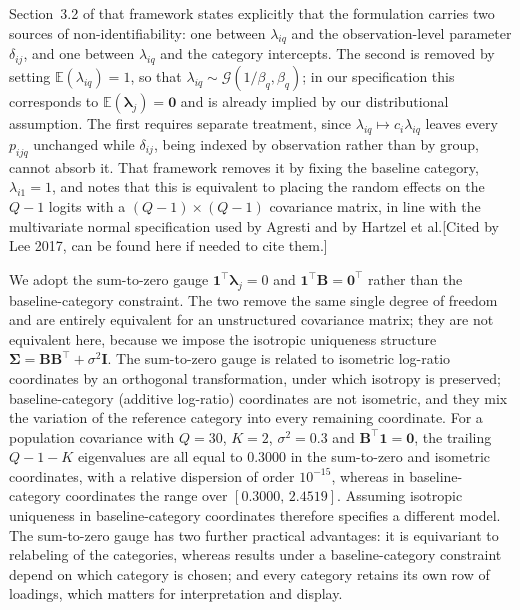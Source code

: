 Section~3.2 of that framework states explicitly that the formulation carries two sources of non-identifiability: one between $\lambda_{iq}$ and the observation-level parameter $\delta_{ij}$, and one between $\lambda_{iq}$ and the category intercepts. The second is removed by setting $\mathbb{E}(\lambda_{iq})=1$, so that $\lambda_{iq}\sim\mathcal{G}(1/\beta_q,\beta_q)$; in our specification this corresponds to $\mathbb{E}(\bm{\lambda}_j)=\mathbf{0}$ and is already implied by our distributional assumption. The first requires separate treatment, since $\lambda_{iq}\mapsto c_i\lambda_{iq}$ leaves every $p_{ijq}$ unchanged while $\delta_{ij}$, being indexed by observation rather than by group, cannot absorb it. That framework removes it by fixing the baseline category, $\lambda_{i1}=1$, and notes that this is equivalent to placing the random effects on the $Q-1$ logits with a $(Q-1)\times(Q-1)$ covariance matrix, in line with the multivariate normal specification used by Agresti and by Hartzel et al.[Cited by Lee 2017, can be found here if needed to cite them.]

We adopt the sum-to-zero gauge $\mathbf{1}^{\top}\bm{\lambda}_j=0$ and $\mathbf{1}^{\top}\mathbf{B}=\mathbf{0}^{\top}$ rather than the baseline-category constraint. The two remove the same single degree of freedom and are entirely equivalent for an unstructured covariance matrix; they are not equivalent here, because we impose the isotropic uniqueness structure $\bm{\Sigma}=\mathbf{B}\mathbf{B}^{\top}+\sigma^{2}\mathbf{I}$. The sum-to-zero gauge is related to isometric log-ratio coordinates by an orthogonal transformation, under which isotropy is preserved; baseline-category (additive log-ratio) coordinates are not isometric, and they mix the variation of the reference category into every remaining coordinate. For a population covariance with $Q=30$, $K=2$, $\sigma^{2}=0.3$ and $\mathbf{B}^{\top}\mathbf{1}=\mathbf{0}$, the trailing $Q-1-K$ eigenvalues are all equal to $0.3000$ in the sum-to-zero and isometric coordinates, with a relative dispersion of order $10^{-15}$, whereas in baseline-category coordinates the range over $[0.3000,\,2.4519]$. Assuming isotropic uniqueness in baseline-category coordinates therefore specifies a different model. The sum-to-zero gauge has two further practical advantages: it is equivariant to relabeling of the categories, whereas results under a baseline-category constraint depend on which category is chosen; and every category retains its own row of loadings, which matters for interpretation and display.

